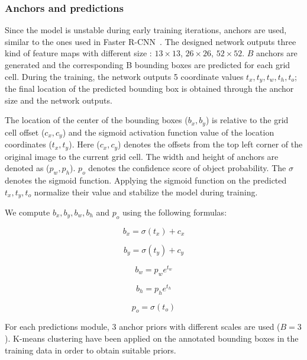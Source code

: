 \subsubsection{Anchors and predictions}
Since the model is unstable during early training iterations, anchors are used, similar to the ones used in Faster R-CNN~\cite{FasterRCNN}. The designed network outputs three kind of feature maps with different size : $13 \times 13$, $26 \times 26$, $52 \times 52$. $B$ anchors are generated and the corresponding B bounding boxes are predicted for each grid cell. During the training, the network outputs 5 coordinate values $t_x, t_y, t_w, t_h, t_o$; the final location of the predicted bounding box is obtained through the anchor size and the network outputs. 

The location of the center of the bounding boxes ($b_x, b_y$) is relative to the grid cell offset ($c_x, c_y$) and the sigmoid activation function value of the location coordinates ($t_x, t_y$). Here ($c_x, c_y$) denotes the offsets from the top left corner of the original image to the current grid cell. The width and height of anchors are denoted as ($p_w, p_h$). $p_o$ denotes the confidence score of object probability. The $\sigma$ denotes the sigmoid function. Applying the sigmoid function on the predicted $t_x, t_y, t_o$ normalize their value and stabilize the model during training.

We compute $b_x, b_y, b_w, b_h$ and $p_o$ using the following formulas:

\begin{equation}
	b_x = \sigma(t_x) + c_x
\end{equation}

\begin{equation}
	b_y = \sigma(t_y) + c_y
\end{equation}

\begin{equation}
	b_w =  p_w e^{t_w}
\end{equation}

\begin{equation}
	b_h =  p_h e^{t_h}
\end{equation}

\begin{equation}
	p_o = \sigma(t_o)
\end{equation}

For each predictions module, 3 anchor priors with different scales are used ($B= 3$). K-means clustering have been applied on the annotated bounding boxes in the training data in order to obtain suitable priors.

